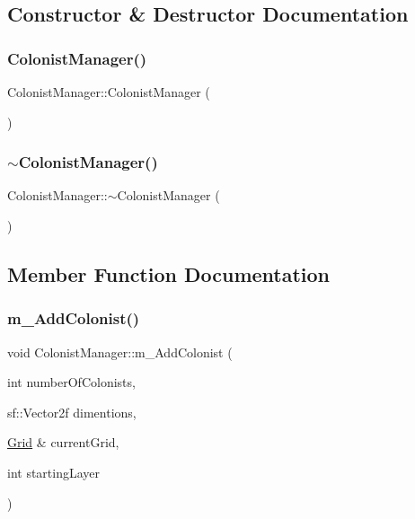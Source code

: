 \subsection{Constructor \& Destructor Documentation}
\mbox{\label{class_colonist_manager_ae4103d1c28b871155a10f8df08974c7e}} 
\subsubsection{\texorpdfstring{Colonist\+Manager()}{ColonistManager()}}
{\footnotesize\ttfamily Colonist\+Manager\+::\+Colonist\+Manager (\begin{DoxyParamCaption}{ }\end{DoxyParamCaption})}

\mbox{\label{class_colonist_manager_a33c8e31a0646e00653ce25c06f7e5038}} 
\subsubsection{\texorpdfstring{$\sim$\+Colonist\+Manager()}{~ColonistManager()}}
{\footnotesize\ttfamily Colonist\+Manager\+::$\sim$\+Colonist\+Manager (\begin{DoxyParamCaption}{ }\end{DoxyParamCaption})}



\subsection{Member Function Documentation}
\mbox{\label{class_colonist_manager_a068d45eb539d9349c00771208c019187}} 
\subsubsection{\texorpdfstring{m\+\_\+\+Add\+Colonist()}{m\_AddColonist()}}
{\footnotesize\ttfamily void Colonist\+Manager\+::m\+\_\+\+Add\+Colonist (\begin{DoxyParamCaption}\item[{int}]{number\+Of\+Colonists,  }\item[{sf\+::\+Vector2f}]{dimentions,  }\item[{\mbox{\hyperlink{class_grid}{Grid}} \&}]{current\+Grid,  }\item[{int}]{starting\+Layer }\end{DoxyParamCaption})}

